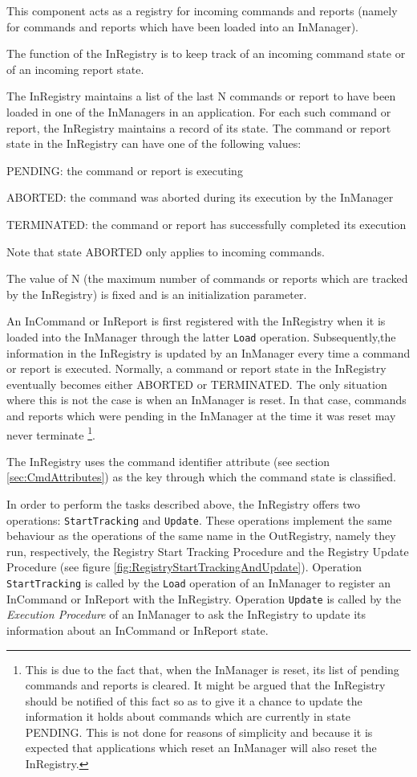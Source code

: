 This component acts as a registry for incoming commands and reports (namely for commands and reports which have been loaded into an InManager).

The function of the InRegistry is to keep track of an incoming command state or of an incoming report state.

The InRegistry maintains a list of the last N commands or report to have been loaded in one of the InManagers in an application. For each such command or report, the InRegistry maintains a record of its state. The command or report state in the InRegistry can have one of the following values:
\begin{fw_itemize}
\item PENDING: the command or report is executing
\item ABORTED: the command was aborted during its execution by the InManager
\item TERMINATED: the command or report has successfully completed its execution
\end{fw_itemize}
Note that state ABORTED only applies to incoming commands.

The value of N (the maximum number of commands or reports which are tracked by the InRegistry) is fixed and is an initialization parameter.

An InCommand or InReport is first registered with the InRegistry when it is loaded into the InManager through the latter \texttt{Load} operation. Subsequently,the information in the InRegistry is updated by an InManager every time a command or report is executed. Normally, a command or report state in the InRegistry eventually becomes either ABORTED or TERMINATED. The only situation where this is not the case is when an InManager is reset. In that case, commands and reports which were pending in the InManager at the time it was reset may never terminate \footnote{This is due to the fact that, when the InManager is reset, its list of pending commands and reports is cleared. It might be argued that the InRegistry should be notified of this fact so as to give it a chance to update the information it holds about commands which are currently in state PENDING. This is not done for reasons of simplicity and because it is expected that applications which reset an InManager will also  reset the InRegistry.}.

The InRegistry uses the command identifier attribute (see section \ref{sec:CmdAttributes}) as the key through which the command state is classified.

In order to perform the tasks described above, the InRegistry offers two operations: \texttt{StartTracking} and \texttt{Update}. These operations implement the same behaviour as the operations of the same name in the OutRegistry, namely they run, respectively, the Registry Start Tracking Procedure and the Registry Update Procedure (see figure \ref{fig:RegistryStartTrackingAndUpdate}). Operation \texttt{StartTracking} is called by the \texttt{Load} operation of an InManager to register an InCommand or InReport with the InRegistry. Operation \texttt{Update} is called by the \textit{Execution Procedure} of an InManager to ask the InRegistry to update its information about an InCommand or InReport state.

